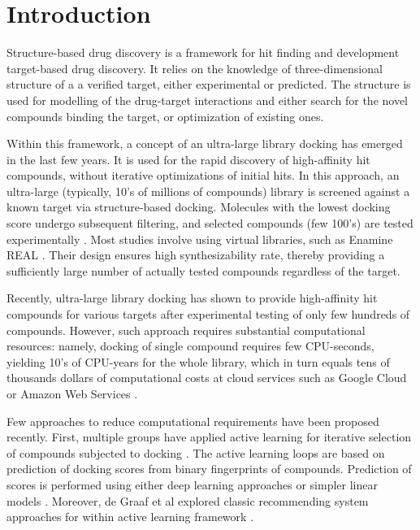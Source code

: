 \section{Introduction}

Structure-based drug discovery is a framework for hit finding and development target-based drug discovery. It relies on the knowledge of three-dimensional structure of a a verified target, either experimental or predicted. The structure is used for modelling of the drug-target interactions and either search for the novel compounds binding the target, or optimization of existing ones.

Within this framework, a concept of an ultra-large library docking has emerged in the last few years. It is used for the rapid discovery of high-affinity hit compounds, without iterative optimizations of initial hits. In this approach, an ultra-large (typically, 10's of millions of compounds) library is screened against a known target via structure-based docking. Molecules with the lowest docking score undergo subsequent filtering, and selected compounds (few 100's) are tested experimentally \cite{bender_practical_2021}. Most studies involve using virtual libraries, such as Enamine REAL \cite{noauthor_real_nodate}. Their design ensures high synthesizability rate, thereby providing a sufficiently large number of actually tested compounds regardless of the target.

Recently, ultra-large library docking has shown to provide high-affinity hit compounds for various targets \cite{sigma2_paper, melatonin_paper, ultralarge_docking_first, gorgulla_open-source_2020, beroza_chemical_2022, noauthor_large_nodate, lu_structure-guided_2021, sadybekov_synthon-based_2022, sadybekov_structure-based_2020} after experimental testing of only few hundreds of compounds. However, such approach requires substantial computational resources: namely, docking of single compound requires few CPU-seconds, yielding 10's of CPU-years for the whole library, which in turn equals tens of thousands dollars of computational costs at cloud services such as Google Cloud or Amazon Web Services \cite{irwin_large_2023,grebner_virtual_2020}.

Few approaches to reduce computational requirements have been proposed recently. First, multiple groups have applied active learning for iterative selection of compounds subjected to docking \cite{Graff2021AcceleratingLearning,autoencoders_guided_learning,logistic_regression,deepdocking,leandocking,Yang2021_shoichet_active_learning}. The active learning loops are based on prediction of docking scores from binary fingerprints of compounds. Prediction of scores is performed using either deep learning approaches \cite{deepdocking,Yang2021_shoichet_active_learning,autoencoders_guided_learning, Graff2021AcceleratingLearning} or simpler linear models \cite{leandocking,logistic_regression}. Moreover, de Graaf et al explored classic recommending system approaches for within active learning framework \cite{Graff2021AcceleratingLearning}. 

